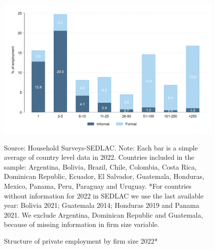 \documentclass[english]{article}
\begin{document}
\begin{itemize}
            \begin{figure}[H]
                    \justifying
                    \caption{Structure of private employment by firm size 2022*}     \centerline{\includegraphics[scale=.3]{latex/figures/Snapshot/Employment and SS by firmsize_2.png}}
                    \label{fig:firmsize2022}
                    \footnotesize{Source: Household Surveys-SEDLAC.}
                    \footnotesize{Note: Each bar is a simple average of country level data in 2022. Countries included in the sample: Argentina, Bolivia, Brazil, Chile, Colombia, Costa Rica, Dominican Republic, Ecuador, El Salvador, Guatemala, Honduras, Mexico, Panama, Peru, Paraguay and Uruguay. *For countries without information for 2022 in SEDLAC we use the last available year: Bolivia 2021; Guatemala 2014; Honduras 2019 and Panama 2021. We exclude Argentina, Dominican Republic and Guatemala, because of missing information in firm size variable.}
            \end{figure}
    
    
            

\end{itemize}
\end{document}
